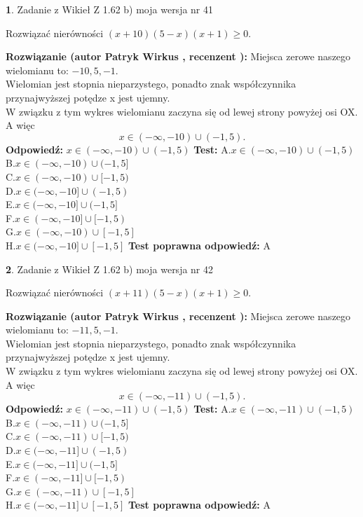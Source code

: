 \documentclass[12pt, a4paper]{article}
\theoremstyle{definition} %
\newtheorem{zad}{}
\newcommand{\zadStart}[1]{\begin{zad}#1\newline}
\newcommand{\zadStop}{\end{zad}}
\newcommand{\rozwStart}[2]{\noindent \textbf{Rozwiązanie (autor #1 , recenzent #2): }\newline}
\newcommand{\rozwStop}{\newline}
\newcommand{\odpStart}{\noindent \textbf{Odpowiedź:}\newline}
\newcommand{\odpStop}{\newline}
\newcommand{\testStart}{\noindent \textbf{Test:}\newline}
\newcommand{\testStop}{\newline}
\newcommand{\kluczStart}{\noindent \textbf{Test poprawna odpowiedź:}\newline}
\newcommand{\kluczStop}{\newline}
\begin{document}
\zadStart{Zadanie z Wikieł Z 1.62 b) moja wersja nr 41}

Rozwiązać nierówności $(x+10)(5-x)(x+1)\ge0$.
\zadStop
\rozwStart{Patryk Wirkus}{}
Miejsca zerowe naszego wielomianu to: $-10, 5, -1$.\\
Wielomian jest stopnia nieparzystego, ponadto znak współczynnika przy\linebreak najwyższej potędze x jest ujemny.\\ W związku z tym wykres wielomianu zaczyna się od lewej strony powyżej osi OX. A więc $$x \in (-\infty,-10) \cup (-1,5).$$
\rozwStop
\odpStart
$x \in (-\infty,-10) \cup (-1,5)$
\odpStop
\testStart
A.$x \in (-\infty,-10) \cup (-1,5)$\\
B.$x \in (-\infty,-10) \cup (-1,5]$\\
C.$x \in (-\infty,-10) \cup [-1,5)$\\
D.$x \in (-\infty,-10] \cup (-1,5)$\\
E.$x \in (-\infty,-10] \cup (-1,5]$\\
F.$x \in (-\infty,-10] \cup [-1,5)$\\
G.$x \in (-\infty,-10) \cup [-1,5]$\\
H.$x \in (-\infty,-10] \cup [-1,5]$
\testStop
\kluczStart
A
\kluczStop



\zadStart{Zadanie z Wikieł Z 1.62 b) moja wersja nr 42}

Rozwiązać nierówności $(x+11)(5-x)(x+1)\ge0$.
\zadStop
\rozwStart{Patryk Wirkus}{}
Miejsca zerowe naszego wielomianu to: $-11, 5, -1$.\\
Wielomian jest stopnia nieparzystego, ponadto znak współczynnika przy\linebreak najwyższej potędze x jest ujemny.\\ W związku z tym wykres wielomianu zaczyna się od lewej strony powyżej osi OX. A więc $$x \in (-\infty,-11) \cup (-1,5).$$
\rozwStop
\odpStart
$x \in (-\infty,-11) \cup (-1,5)$
\odpStop
\testStart
A.$x \in (-\infty,-11) \cup (-1,5)$\\
B.$x \in (-\infty,-11) \cup (-1,5]$\\
C.$x \in (-\infty,-11) \cup [-1,5)$\\
D.$x \in (-\infty,-11] \cup (-1,5)$\\
E.$x \in (-\infty,-11] \cup (-1,5]$\\
F.$x \in (-\infty,-11] \cup [-1,5)$\\
G.$x \in (-\infty,-11) \cup [-1,5]$\\
H.$x \in (-\infty,-11] \cup [-1,5]$
\testStop
\kluczStart
A
\kluczStop
\end{document}
